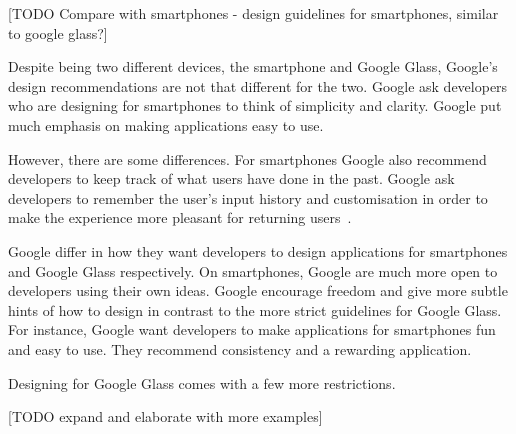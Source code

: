 [TODO Compare with smartphones - design guidelines for smartphones, similar to google glass?]

Despite being two different devices, the smartphone and Google Glass, Google's design recommendations are not that different for the two. Google ask developers who are designing for smartphones to think of simplicity and clarity. Google put much emphasis on making applications easy to use.

However, there are some differences. For smartphones Google also recommend developers to keep track of what users have done in the past. Google ask developers to remember the user's input history and customisation in order to make the experience more pleasant for returning users~\cite{androidDesignPrinciples}.

Google differ in how they want developers to design applications for smartphones and Google Glass respectively. On smartphones, Google are much more open to developers using their own ideas. Google encourage freedom and give more subtle hints of how to design in contrast to the more strict guidelines for Google Glass. For instance, Google want developers to make applications for smartphones fun and easy to use. They recommend consistency and a rewarding application.

Designing for Google Glass comes with a few more restrictions. 

[TODO expand and elaborate with more examples]